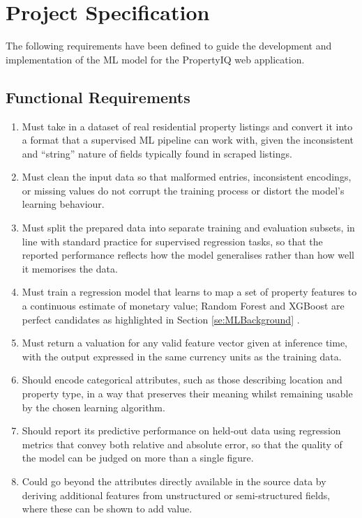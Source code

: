 \chapter{Project Specification}
\label{ch:Specifications}

The following requirements have been defined to guide the development and implementation of the ML model for the PropertyIQ web application.

\section{Functional Requirements}

\begin{enumerate}
    
    \item Must take in a dataset of real residential property listings and convert it into a format that a supervised ML pipeline can work with, given the inconsistent and ``string'' nature of fields typically found in scraped listings.
    
    \item Must clean the input data so that malformed entries, inconsistent encodings, or missing values do not corrupt the training process or distort the model's learning behaviour.
    
    \item Must split the prepared data into separate training and evaluation subsets, in line with standard practice for supervised regression tasks, so that the reported performance reflects how the model generalises rather than how well it memorises the data.
    
    \item Must train a regression model that learns to map a set of property features to a continuous estimate of monetary value; Random Forest and XGBoost are perfect candidates as highlighted in Section \ref{se:MLBackground} .

    \item Must return a valuation for any valid feature vector given at inference time, with the output expressed in the same currency units as the training data.

    \item Should encode categorical attributes, such as those describing location and property type, in a way that preserves their meaning whilst remaining usable by the chosen learning algorithm.

    \item Should report its predictive performance on held-out data using regression metrics that convey both relative and absolute error, so that the quality of the model can be judged on more than a single figure.

    \item Could go beyond the attributes directly available in the source data by deriving additional features from unstructured or semi-structured fields, where these can be shown to add value.

\end{enumerate}


